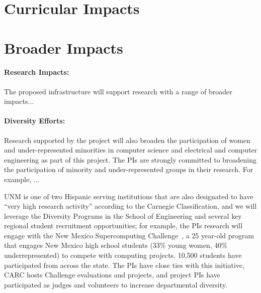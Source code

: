 \section{Curricular Impacts}
\label{sec:education}

\section{Broader Impacts}
\label{sec:broader}

\paragraph{Research Impacts:} The proposed infrastructure will support research with a range of 
broader impacts...

\paragraph{Diversity Efforts:} Research supported by the project will also broaden the participation of women and under-represented
minorities in computer science and electrical and computer engineering
as part of this project. The PIs are strongly committed to broadening the
participation of minority and under-represented groups in their research. 
For example, ...

UNM is one of two Hispanic serving institutions that are also designated
to have ``very high research activity''
according to the Carnegie Classification, and we will leverage the Diversity
Programs in the School of Engineering and several key regional student
recruitment opportunities; for example, the PIs research will engage with the New Mexico
Supercomputing Challenge~\cite{NMChallenge}, a 25 year-old program that
engages New Mexico high school students (33\% young women, 40\% underrepresented)
to compete with computing projects.  10,500 students have participated from across the state. The
PIs have close ties with this initiative, CARC hosts Challenge evaluations and projects,
and project PIs have participated as judges and volunteers to increase departmental diversity.
